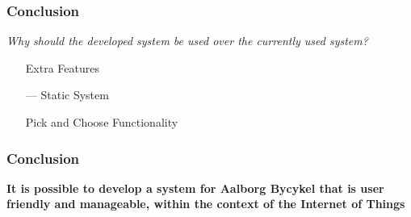 \begin{frame}
	\frametitle{Conclusion}
	\begin{center}
		\textit{Why should the developed system be used over the currently used system?}
	\end{center}
	
	\begin{itemize}
		\item[\color{green}\checkmark] Extra Features
		\item[\color{orange}---] Static System
		\item[\color{green}\checkmark] Pick and Choose Functionality
	\end{itemize}
\end{frame}

\begin{frame}
	\frametitle{Conclusion}
	\begin{center}
		\textbf{It is possible to develop a system for Aalborg Bycykel that is user friendly and manageable, within the context of the Internet of Things}
	\end{center}
\end{frame}